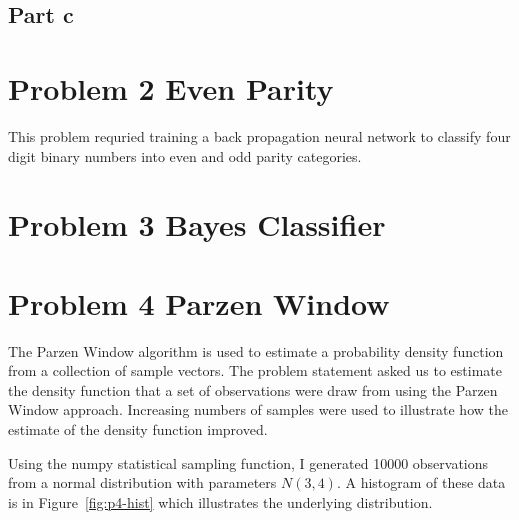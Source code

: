 \documentclass{report}
\begin{document}
\subsection*{Part c}

\section*{Problem 2 Even Parity}
This problem requried training a back propagation neural
network to classify four digit binary numbers into even and odd
parity categories.


\section*{Problem 3 Bayes Classifier}

\section*{Problem 4 Parzen Window}
The Parzen Window algorithm is used to estimate a probability density
function from a collection of sample vectors. The problem statement
asked us to estimate the density function that a set of observations
were draw from using the Parzen Window approach.  Increasing numbers
of samples were used to illustrate how the estimate of the
density function improved.


Using the numpy statistical sampling function, I generated 10000
observations from a normal distribution with parameters $N(3,4)$.  A
histogram of these data is in Figure~\ref{fig:p4-hist} which illustrates
the underlying distribution.
\end{document}
